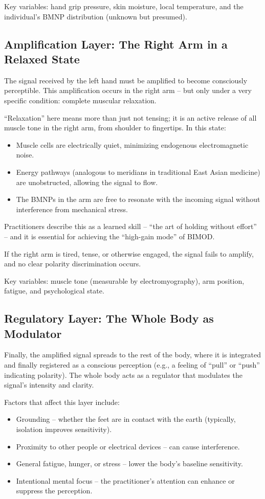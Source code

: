 \documentclass[12pt,a4paper]{article}
\begin{document}
Key variables: hand grip pressure, skin moisture, local temperature, and the individual's BMNP distribution (unknown but presumed).

\subsection{Amplification Layer: The Right Arm in a Relaxed State}

The signal received by the left hand must be amplified to become consciously perceptible. This amplification occurs in the right arm – but only under a very specific condition: complete muscular relaxation.

``Relaxation'' here means more than just not tensing; it is an active release of all muscle tone in the right arm, from shoulder to fingertips. In this state:
\begin{itemize}
    \item Muscle cells are electrically quiet, minimizing endogenous electromagnetic noise.
    \item Energy pathways (analogous to meridians in traditional East Asian medicine) are unobstructed, allowing the signal to flow.
    \item The BMNPs in the arm are free to resonate with the incoming signal without interference from mechanical stress.
\end{itemize}

Practitioners describe this as a learned skill – ``the art of holding without effort'' – and it is essential for achieving the ``high-gain mode'' of BIMOD.

If the right arm is tired, tense, or otherwise engaged, the signal fails to amplify, and no clear polarity discrimination occurs.

Key variables: muscle tone (measurable by electromyography), arm position, fatigue, and psychological state.

\subsection{Regulatory Layer: The Whole Body as Modulator}

Finally, the amplified signal spreads to the rest of the body, where it is integrated and finally registered as a conscious perception (e.g., a feeling of ``pull'' or ``push'' indicating polarity). The whole body acts as a regulator that modulates the signal's intensity and clarity.

Factors that affect this layer include:
\begin{itemize}
    \item Grounding – whether the feet are in contact with the earth (typically, isolation improves sensitivity).
    \item Proximity to other people or electrical devices – can cause interference.
    \item General fatigue, hunger, or stress – lower the body's baseline sensitivity.
    \item Intentional mental focus – the practitioner's attention can enhance or suppress the perception.
\end{itemize}
\end{document}
